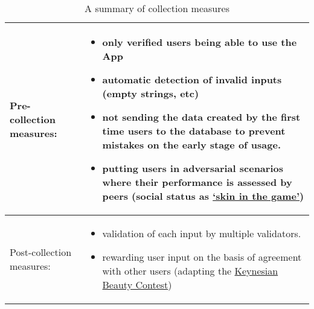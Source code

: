 \documentclass{article}
\begin{document}
  \begin{table}[h!]
      \centering
    \begin{tabular}{|l|p{8cm}|}
\toprule
Pre-collection measures:  & \begin{itemize}[left=0pt,topsep=0pt]\item only verified users being able to use the App
  \item automatic detection of invalid inputs (empty strings, etc)
  \item not sending the data created by the first time users to the database to prevent mistakes on the early stage of usage.
  \item putting users in adversarial scenarios where their performance is assessed by peers (social status as \href{https://dictionary.cambridge.org/dictionary/english/have-skin-in-the-game}{`skin in the game'})
\end{itemize} \\
\midrule
       Post-collection measures:  & \begin{itemize}[left=0pt,topsep=0pt]
  \item validation of each input by multiple validators.  
  \item rewarding user input on the basis of agreement with other users (adapting the \href{https://en.wikipedia.org/wiki/Keynesian_beauty_contest}{Keynesian Beauty Contest}\cite{Keynes1936})
\end{itemize} \\
\bottomrule
    \end{tabular}
    \caption{A summary of collection measures}

 \end{table}\label{tab:collection}

\end{document}
